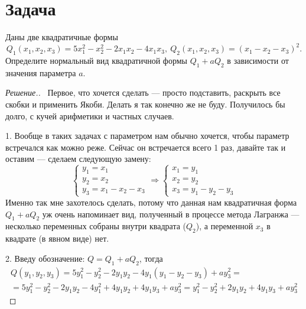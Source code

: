 \documentclass[a4paper]{article}
\theoremstyle{remark}
\newcommand{\eq}[1]{\begin{cases} #1 \end{cases}}
\begin{document}
    \section*{Задача }
        Даны две квадратичные формы 
        \[ 
            Q_1(x_1, x_2, x_3) = 5x_1^2 - x_2^2 - 2x_1x_2 - 4x_1x_3, \
            Q_2(x_1, x_2, x_3) = (x_1 - x_2 - x_3)^2. 
        \]
         Определите нормальный вид квадратичной формы $Q_1 + aQ_2$ в зависимости 
         от значения параметра $a$.
        \begin{proof}[Решение.] \ 
            Первое, что хочется сделать --- просто подставить, 
            раскрыть все скобки и применить Якоби. Делать я так конечно же не буду. Получилось бы долго, 
            с кучей арифметики и частных случаев. 

            1. Вообще в таких задачах с параметром нам обычно хочется, чтобы параметр 
            встречался как можно реже. Сейчас он встречается всего 1 раз, давайте так и оставим --- сделаем 
            следующую замену: 
            \[
                \eq{
                    y_1 = x_1\\ 
                    y_2 = x_2 \\ 
                    y_3 = x_1 - x_2 - x_3
                } 
                \Rightarrow
                \eq{
                    x_1 = y_1\\ 
                    x_2 = y_2 \\ 
                    x_3 = y_1 - y_2 - y_3
                }
            \]
            Именно так мне захотелось сделать, потому что данная нам квадратичная форма $Q_1 + aQ_2$ 
            уж очень напоминает вид, полученный в процессе метода Лагранжа --- 
            несколько переменных собраны внутри квадрата ($Q_2$), а переменной $x_3$ в квадрате (в явном виде) нет.
            
            2. Введу обозначение: $Q = Q_1 + aQ_2$, тогда 
            \begin{multline*}
                Q(y_1, y_2, y_3) = 
                5y_1^2 - y_2^2 - 2y_1y_2 - 4y_1(y_1 - y_2 - y_3) + ay_3^2 = \\ =
                5y_1^2 - y_2^2 - 2y_1y_2 - 4y_1^2 + 4y_1y_2 + 4y_1y_3 + ay_3^2 = 
                y_1^2 - y_2^2 + 2y_1y_2 + 4y_1y_3 + ay_3^2
            \end{multline*}


\end{proof}
\end{document}
